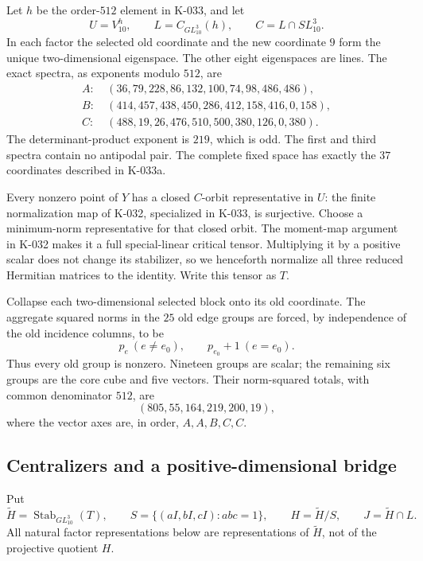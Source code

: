 Let $h$ be the order-$512$ element in K-033, and let
\[
 U=V_{10}^h,
 \qquad L=C_{GL_{10}^3}(h),
 \qquad C=L\cap SL_{10}^3.
\]
In each factor the selected old coordinate and the new coordinate
$9$ form the unique two-dimensional eigenspace.  The other eight
eigenspaces are lines.  The exact spectra, as exponents modulo $512$,
are
\[
\begin{aligned}
 A:&\ (36,79,228,86,132,100,74,98,486,486),\\
 B:&\ (414,457,438,450,286,412,158,416,0,158),\\
 C:&\ (488,19,26,476,510,500,380,126,0,380).
\end{aligned}                                             \tag{K-035b}
\]
The determinant-product exponent is $219$, which is odd.  The first
and third spectra contain no antipodal pair.  The complete fixed
space has exactly the $37$ coordinates described in K-033a.

Every nonzero point of $Y$ has a closed $C$-orbit representative in
$U$: the finite normalization map of K-032, specialized in K-033,
is surjective.  Choose a minimum-norm representative for that closed
orbit.  The moment-map argument in K-032 makes it a full
special-linear critical tensor.  Multiplying it by a positive scalar
does not change its stabilizer, so we henceforth normalize all three
reduced Hermitian matrices to the identity.  Write this tensor as $T$.

Collapse each two-dimensional selected block onto its old coordinate.
The aggregate squared norms in the $25$ old edge groups are forced,
by independence of the old incidence columns, to be
\[
                 p_e\ (e\ne e_0),\qquad p_{e_0}+1\ (e=e_0).
                                                               \tag{K-035c}
\]
Thus every old group is nonzero.  Nineteen groups are scalar; the
remaining six groups are the core cube and five vectors.  Their
norm-squared totals, with common denominator $512$, are
\[
                       (805,55,164,219,200,19),           \tag{K-035d}
\]
where the vector axes are, in order, $A,A,B,C,C$.

\subsection*{Centralizers and a positive-dimensional bridge}

Put
\[
 \widetilde H=\operatorname{Stab}_{GL_{10}^3}(T),\qquad
 S=\{(aI,bI,cI):abc=1\},\qquad H=\widetilde H/S,
 \qquad J=\widetilde H\cap L.
\]
All natural factor representations below are representations of
$\widetilde H$, not of the projective quotient $H$.

